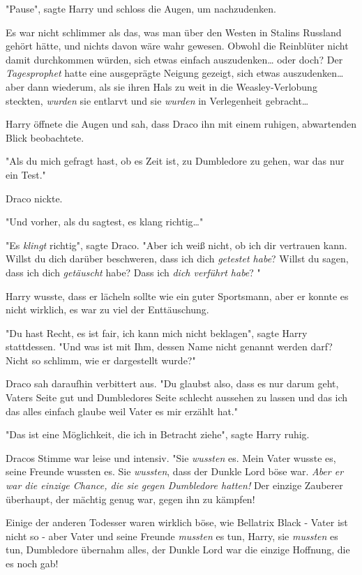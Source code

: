 {"Pause", sagte Harry und schloss die Augen, um nachzudenken.

Es war nicht schlimmer als das, was man über den Westen in Stalins Russland gehört hätte, und nichts davon wäre wahr gewesen. Obwohl die Reinblüter nicht damit durchkommen würden, sich etwas einfach auszudenken… oder doch? Der \emph{Tagesprophet} hatte eine ausgeprägte Neigung gezeigt, sich etwas auszudenken… aber dann wiederum, als sie ihren Hals zu weit in die Weasley-Verlobung steckten, \emph{wurden} sie entlarvt und sie \emph{wurden} in Verlegenheit gebracht…

Harry öffnete die Augen und sah, dass Draco ihn mit einem ruhigen, abwartenden Blick beobachtete.

"Als du mich gefragt hast, ob es Zeit ist, zu Dumbledore zu gehen, war das nur ein Test."

Draco nickte.

"Und vorher, als du sagtest, es klang richtig…"

"Es \emph{klingt} richtig", sagte Draco. "Aber ich weiß nicht, ob ich dir vertrauen kann. Willst du dich darüber beschweren, dass ich dich \emph{getestet habe}? Willst du sagen, dass ich dich \emph{getäuscht} habe? Dass ich \emph{dich verführt habe}? "

Harry wusste, dass er lächeln sollte wie ein guter Sportsmann, aber er konnte es nicht wirklich, es war zu viel der Enttäuschung.

"Du hast Recht, es ist fair, ich kann mich nicht beklagen", sagte Harry stattdessen. "Und was ist mit Ihm, dessen Name nicht genannt werden darf? Nicht so schlimm, wie er dargestellt wurde?"

Draco sah daraufhin verbittert aus. "Du glaubst also, dass es nur darum geht, Vaters Seite gut und Dumbledores Seite schlecht aussehen zu lassen und das ich das alles einfach glaube weil Vater es mir erzählt hat."

"Das ist eine Möglichkeit, die ich in Betracht ziehe", sagte Harry ruhig.

Dracos Stimme war leise und intensiv. "Sie \emph{wussten} es. Mein Vater wusste es, seine Freunde wussten es. Sie \emph{wussten}, dass der Dunkle Lord böse war. \emph{Aber er war die einzige Chance, die sie gegen Dumbledore hatten!} Der einzige Zauberer überhaupt, der mächtig genug war, gegen ihn zu kämpfen!

Einige der anderen Todesser waren wirklich böse, wie Bellatrix Black - Vater ist nicht so - aber Vater und seine Freunde \emph{mussten} es tun, Harry, sie \emph{mussten} es tun, Dumbledore übernahm alles, der Dunkle Lord war die einzige Hoffnung, die es noch gab!

}
